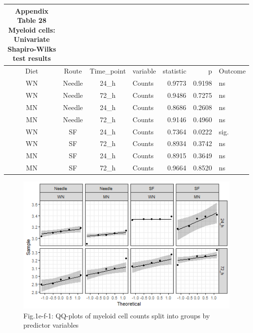 \documentclass[
  12pt,
  letterpaper,
]{article}
\begin{document}
\begingroup
\fontsize{12.0pt}{14.4pt}\selectfont
\begin{longtable}{ccclrrl}
\caption*{
{\large \textbf{Appendix Table 28}} \\ 
{\small \textbf{Myeloid cells: Univariate Shapiro-Wilks test results}}
} \\ 
\toprule
{Diet} & {Route} & Time\_point & {variable} & {statistic} & {p} & {Outcome} \\ 
\midrule\addlinespace[2.5pt]
WN & Needle & 24\_h & Counts & 0.9773 & 0.9198 & ns \\ 
WN & Needle & 72\_h & Counts & 0.9486 & 0.7275 & ns \\ 
MN & Needle & 24\_h & Counts & 0.8686 & 0.2608 & ns \\ 
MN & Needle & 72\_h & Counts & 0.9146 & 0.4960 & ns \\ 
WN & SF & 24\_h & Counts & 0.7364 & 0.0222 & sig. \\ 
WN & SF & 72\_h & Counts & 0.8934 & 0.3742 & ns \\ 
MN & SF & 24\_h & Counts & 0.8915 & 0.3649 & ns \\ 
MN & SF & 72\_h & Counts & 0.9664 & 0.8520 & ns \\ 
\bottomrule
\end{longtable}
\endgroup

\begin{figure}[H]

{\centering \includegraphics[width=0.95\linewidth,]{Statistics_Report_files/figure-latex/qq-plot-figure-1e-f-myeloid-cells-1} 

}

\caption{Fig.1e-f-1: QQ-plots of myeloid cell counts split into groups by predictor variables}\label{fig:qq-plot-figure-1e-f-myeloid-cells}
\end{figure}
\end{document}
